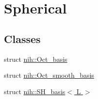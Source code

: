 \hypertarget{group__spherical__functions}{
\section{\-Spherical}
\label{group__spherical__functions}
}
\subsection*{\-Classes}
\begin{DoxyCompactItemize}
\item 
struct \hyperlink{structnih_1_1_oct__basis}{nih\-::\-Oct\-\_\-basis}
\item 
struct \hyperlink{structnih_1_1_oct__smooth__basis}{nih\-::\-Oct\-\_\-smooth\-\_\-basis}
\item 
struct \hyperlink{structnih_1_1_s_h__basis}{nih\-::\-S\-H\-\_\-basis$<$ L $>$}
\end{DoxyCompactItemize}
